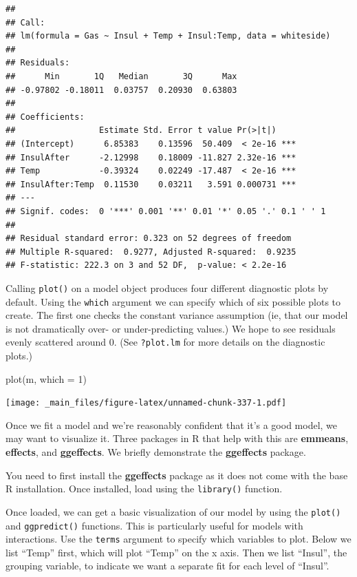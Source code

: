 \documentclass[
]{book}
\newenvironment{Shaded}{\begin{snugshade}}{\end{snugshade}}
\newcommand{\AttributeTok}[1]{\textcolor[rgb]{0.77,0.63,0.00}{#1}}
\newcommand{\DecValTok}[1]{\textcolor[rgb]{0.00,0.00,0.81}{#1}}
\newcommand{\FunctionTok}[1]{\textcolor[rgb]{0.00,0.00,0.00}{#1}}
\newcommand{\NormalTok}[1]{#1}
\begin{document}
\begin{verbatim}
## 
## Call:
## lm(formula = Gas ~ Insul + Temp + Insul:Temp, data = whiteside)
## 
## Residuals:
##      Min       1Q   Median       3Q      Max 
## -0.97802 -0.18011  0.03757  0.20930  0.63803 
## 
## Coefficients:
##                 Estimate Std. Error t value Pr(>|t|)    
## (Intercept)      6.85383    0.13596  50.409  < 2e-16 ***
## InsulAfter      -2.12998    0.18009 -11.827 2.32e-16 ***
## Temp            -0.39324    0.02249 -17.487  < 2e-16 ***
## InsulAfter:Temp  0.11530    0.03211   3.591 0.000731 ***
## ---
## Signif. codes:  0 '***' 0.001 '**' 0.01 '*' 0.05 '.' 0.1 ' ' 1
## 
## Residual standard error: 0.323 on 52 degrees of freedom
## Multiple R-squared:  0.9277, Adjusted R-squared:  0.9235 
## F-statistic: 222.3 on 3 and 52 DF,  p-value: < 2.2e-16
\end{verbatim}

Calling \texttt{plot()} on a model object produces four different diagnostic plots by default. Using the \texttt{which} argument we can specify which of six possible plots to create. The first one checks the constant variance assumption (ie, that our model is not dramatically over- or under-predicting values.) We hope to see residuals evenly scattered around 0. (See \texttt{?plot.lm} for more details on the diagnostic plots.)

\begin{Shaded}
\begin{Highlighting}[]
\FunctionTok{plot}\NormalTok{(m, }\AttributeTok{which =} \DecValTok{1}\NormalTok{)}
\end{Highlighting}
\end{Shaded}

\texttt{[image: \_main\_files/figure-latex/unnamed-chunk-337-1.pdf]}

Once we fit a model and we're reasonably confident that it's a good model, we may want to visualize it. Three packages in R that help with this are \textbf{emmeans}, \textbf{effects}, and \textbf{ggeffects}. We briefly demonstrate the \textbf{ggeffects} package.

You need to first install the \textbf{ggeffects} package as it does not come with the base R installation. Once installed, load using the \texttt{library()} function.

Once loaded, we can get a basic visualization of our model by using the \texttt{plot()} and \texttt{ggpredict()} functions. This is particularly useful for models with interactions. Use the \texttt{terms} argument to specify which variables to plot. Below we list ``Temp'' first, which will plot ``Temp'' on the x axis. Then we list ``Insul'', the grouping variable, to indicate we want a separate fit for each level of ``Insul''.
\end{document}
